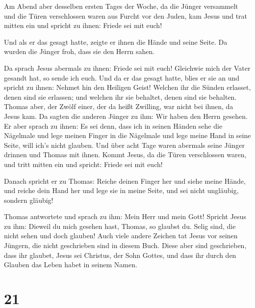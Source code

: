  Am Abend aber desselben ersten Tages der Woche, da die
Jünger versammelt und die Türen verschlossen waren aus Furcht vor den
Juden, kam Jesus und trat mitten ein und spricht zu ihnen: Friede sei
mit euch!

 Und als er das gesagt hatte, zeigte er ihnen die Hände
und seine Seite. Da wurden die Jünger froh, dass sie den Herrn sahen.

 Da sprach Jesus abermals zu ihnen: Friede sei mit euch!
Gleichwie mich der Vater gesandt hat, so sende ich euch. 
Und da er das gesagt hatte, blies er sie an und spricht zu ihnen: Nehmet
hin den Heiligen Geist!  Welchen ihr die Sünden erlasset,
denen sind sie erlassen; und welchen ihr sie behaltet, denen sind sie
behalten.  Thomas aber, der Zwölf einer, der da heißt
Zwilling, war nicht bei ihnen, da Jesus kam.  Da sagten
die anderen Jünger zu ihm: Wir haben den Herrn gesehen. Er aber sprach
zu ihnen: Es sei denn, dass ich in seinen Händen sehe die Nägelmale und
lege meinen Finger in die Nägelmale und lege meine Hand in seine Seite,
will ich's nicht glauben.  Und über acht Tage waren
abermals seine Jünger drinnen und Thomas mit ihnen. Kommt Jesus, da die
Türen verschlossen waren, und tritt mitten ein und spricht: Friede sei
mit euch!

 Danach spricht er zu Thomas: Reiche deinen Finger her
und siehe meine Hände, und reiche dein Hand her und lege sie in meine
Seite, und sei nicht ungläubig, sondern gläubig!

 Thomas antwortete und sprach zu ihm: Mein Herr und mein
Gott!  Spricht Jesus zu ihm: Dieweil du mich gesehen
hast, Thomas, so glaubst du. Selig sind, die nicht sehen und doch
glauben!  Auch viele andere Zeichen tat Jesus vor seinen
Jüngern, die nicht geschrieben sind in diesem Buch. 
Diese aber sind geschrieben, dass ihr glaubet, Jesus sei Christus, der
Sohn Gottes, und dass ihr durch den Glauben das Leben habet in seinem
Namen.

\hypertarget{section-20}{%
\section{21}\label{section-20}}

